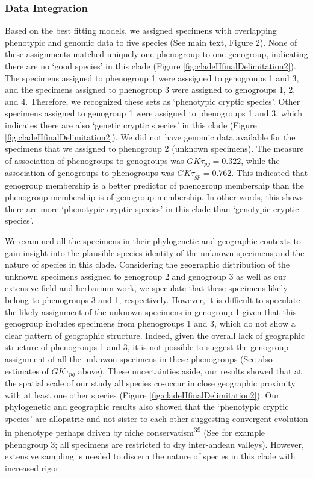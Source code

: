\documentclass[
  11pt,
]{article}
\begin{document}
\hypertarget{data-integration-2}{%
\subsubsection{Data Integration}\label{data-integration-2}}

Based on the best fitting models, we assigned specimens with overlapping phenotypic and genomic data to five species (See main text, Figure 2). None of these assignments matched uniquely one phenogroup to one genogroup, indicating there are no `good species' in this clade (Figure \ref{fig:cladeIIfinalDelimitation2}). The specimens assigned to phenogroup 1 were asssigned to genogroups 1 and 3, and the specimens assigned to phenogroup 3 were assigned to genogroups 1, 2, and 4. Therefore, we recognized these sets as `phenotypic cryptic species'. Other specimens assigned to genogroup 1 were assigned to phenogroups 1 and 3, which indicates there are also `genetic cryptic species' in this clade (Figure \ref{fig:cladeIIfinalDelimitation2}). We did not have genomic data available for the specimens that we assigned to phenogroup 2 (unknown specimens). The measure of association of phenogroups to genogroups was \(GK\tau_{pg}=0.322\), while the association of genogroups to phenogroups was \(GK\tau_{gp}=0.762\). This indicated that genogroup membership is a better predictor of phenogroup membership than the phenogroup membership is of genogroup membership. In other words, this shows there are more `phenotypic cryptic species' in this clade than `genotypic cryptic species'.

We examined all the specimens in their phylogenetic and geographic contexts to gain insight into the plausible species identity of the unknown specimens and the nature of species in this clade. Considering the geographic distribution of the unknown specimens assigned to genogroup 2 and genogroup 3 as well as our extensive field and herbarium work, we speculate that these specimens likely belong to phenogroups 3 and 1, respectively. However, it is difficult to speculate the likely assignment of the unknown specimens in genogroup 1 given that this genogroup includes specimens from phenogroups 1 and 3, which do not show a clear pattern of geographic structure. Indeed, given the overall lack of geographic structure of phenogroups 1 and 3, it is not possible to suggest the genogroup assignment of all the unknwon specimens in these phenogroups (See also estimates of \(GK\tau_{pg}\) above). These uncertainties aside, our results showed that at the spatial scale of our study all species co-occur in close geographic proximity with at least one other species (Figure \ref{fig:cladeIIfinalDelimitation2}). Our phylogenetic and geographic results also showed that the `phenotypic cryptic species' are allopatric and not sister to each other suggesting convergent evolution in phenotype perhaps driven by niche conservatism\textsuperscript{39} (See for example phenogroup 3; all specimens are restricted to dry inter-andean valleys). However, extensive sampling is needed to discern the nature of species in this clade with increased rigor.
\end{document}
